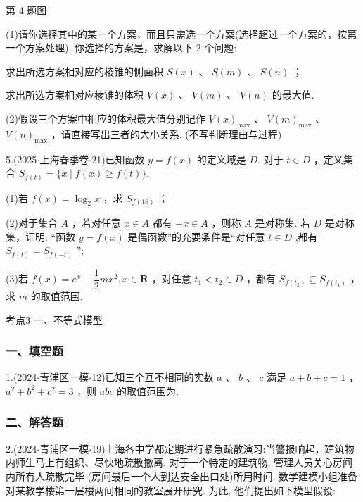 第 4 题图

(1)请你选择其中的某一个方案，而且只需选一个方案(选择超过一个方案的，按第一个方案处理). 你选择的方案是\blkda[2]{}，求解以下 2 个问题:

   求出所选方案相对应的棱锥的侧面积 $S\left( x\right)$ 、 $S\left( m\right)$ 、 $S\left( n\right)$ ；

   求出所选方案相对应棱锥的体积 $V\left( x\right)$ 、 $V\left( m\right)$ 、 $V\left( n\right)$ 的最大值.

(2)假设三个方案中相应的体积最大值分别记作 $V{\left( x\right) }_{\max }$ 、 $V{\left( m\right) }_{\max }$ 、 $V{\left( n\right) }_{\max }$ ，请直接写出三者的大小关系. (不写判断理由与过程)

5.(2025$\cdot$上海春季卷$\cdot$21)已知函数 $y = f\left( x\right)$ 的定义域是 $D$. 对于 $t \in  D$ ，定义集合 ${S}_{f\left( t\right) } = \{ x \mid  f\left( x\right)  \geq  f\left( t\right) \}$.

(1)若 $f\left( x\right)  = {\log }_{2}x$ ，求 ${S}_{f\left( {16}\right) }$ ；

(2)对于集合 $A$ ，若对任意 $x \in  A$ 都有 $- x \in  A$ ，则称 $A$ 是对称集. 若 $D$ 是对称集，证明: “函数 $y = f\left( x\right)$ 是偶函数”的充要条件是“对任意 $t \in  D$ ,都有 ${S}_{f\left( t\right) } = {S}_{f\left( {-t}\right) }$ ”;

(3)若 $f\left( x\right)  = {{e}}^{x} - \dfrac{1}{2}m{x}^{2},x \in  \mathbf{R}$ ，对任意 ${t}_{1} < {t}_{2} \in  D$ ，都有 ${S}_{f\left( {t}_{2}\right) } \subseteq  {S}_{f\left( {t}_{1}\right) }$ ，求 $m$ 的取值范围.

考点3 一、不等式模型

\subsubsection*{一、填空题}

1.(2024$\cdot$青浦区一模$\cdot$12)已知三个互不相同的实数 $a$ 、 $b$ 、 $c$ 满足 $a + b + c = 1$ ， ${a}^{2} + {b}^{2} + {c}^{2} = 3$ ，则 ${abc}$ 的取值范围为\blkda[2]{}.

\subsubsection*{二、解答题}

2.(2024$\cdot$青浦区一模$\cdot$19)上海各中学都定期进行紧急疏散演习:当警报响起，建筑物内师生马上有组织、尽快地疏散撤离. 对于一个特定的建筑物, 管理人员关心房间内所有人疏散完毕 (房间最后一个人到达安全出口处)所用时间. 数学建模小组准备对某教学楼第一层楼两间相同的教室展开研究. 为此, 他们提出如下模型假设:

